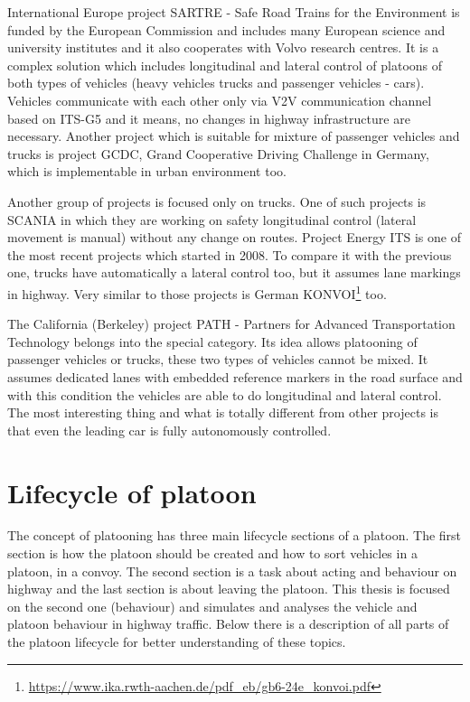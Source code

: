 International Europe project SARTRE - Safe Road Trains for the Environment is funded by the European Commission and includes many European science and university institutes and it also cooperates with Volvo research centres. It is a complex solution which includes longitudinal and lateral control of platoons of both types of vehicles (heavy vehicles trucks and passenger vehicles - cars). Vehicles communicate with each other only via V2V communication channel based on ITS-G5 and it means, no changes in highway infrastructure are necessary. Another project which is suitable for mixture of passenger vehicles and trucks is project GCDC, Grand Cooperative Driving Challenge in Germany, which is implementable in urban environment too.

Another group of projects is focused only on trucks. One of such projects is SCANIA in which they are working on safety longitudinal control (lateral movement is manual) without any change on routes. Project Energy ITS is one of the most recent projects which started in 2008. To compare it with the previous one, trucks have automatically a lateral control too, but it assumes lane markings in highway. Very similar to those projects is German KONVOI\footnote{\url{https://www.ika.rwth-aachen.de/pdf_eb/gb6-24e_konvoi.pdf}}  too.

The California (Berkeley) project PATH - Partners for Advanced Transportation Technology belongs into the special category. Its idea allows platooning of passenger vehicles or trucks, these two types of vehicles cannot be mixed. It assumes dedicated lanes with embedded reference markers in the road surface and with this condition the vehicles are able to do longitudinal and lateral control. The most interesting thing and what is totally different from other projects is that even the leading car is fully autonomously controlled.

\section{Lifecycle of platoon}

The concept of platooning has three main lifecycle sections of a platoon. The first section is how the platoon should be created and how to sort vehicles in a platoon, in a convoy. The second section is a task about acting and behaviour on highway and the last section is about leaving the platoon. This thesis is focused on the second one (behaviour) and simulates and analyses the vehicle and platoon behaviour in highway traffic. Below there is a description of all parts of the platoon lifecycle for better understanding of these topics.

